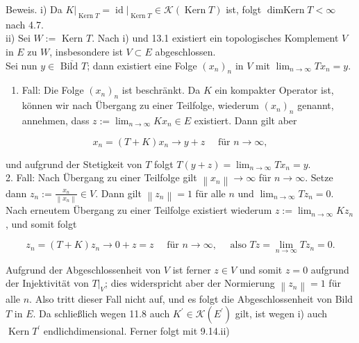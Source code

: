 \documentclass[10pt, letterpaper]{article}
\begin{document}
Beweis. i) Da $\left.K\right|_{\operatorname{Kern} T}=\left.\operatorname{id}\right|_{\operatorname{Kern} T} \in \mathcal{K}(\operatorname{Kern} T)$ ist, folgt $\operatorname{dimKern} T<\infty$ nach 4.7.\\
ii) Sei $W:=$ Kern $T$. Nach i) und 13.1 existiert ein topologisches Komplement $V$ in $E$ zu $W$, insbesondere ist $V \subset E$ abgeschlossen.\\
Sei nun $y \in \overline{\text { Bild } T}$; dann existiert eine Folge $\left(x_{n}\right)_{n}$ in $V$ mit $\lim _{n \rightarrow \infty} T x_{n}=y$.

\begin{enumerate}
  \item Fall: Die Folge $\left(x_{n}\right)_{n}$ ist beschränkt. Da $K$ ein kompakter Operator ist, können wir nach Übergang zu einer Teilfolge, wiederum $\left(x_{n}\right)_{n}$ genannt, annehmen, dass $z:=\lim _{n \rightarrow \infty} K x_{n} \in E$ existiert. Dann gilt aber
\end{enumerate}

$$
x_{n}=(T+K) x_{n} \rightarrow y+z \quad \text { für } n \rightarrow \infty,
$$

und aufgrund der Stetigkeit von $T$ folgt $T(y+z)=\lim _{n \rightarrow \infty} T x_{n}=y$.\\
2. Fall: Nach Übergang zu einer Teilfolge gilt $\left\|x_{n}\right\| \rightarrow \infty$ für $n \rightarrow \infty$. Setze dann $z_{n}:=\frac{x_{n}}{\left\|x_{n}\right\|} \in V$. Dann gilt $\left\|z_{n}\right\|=1$ für alle $n$ und $\lim _{n \rightarrow \infty} T z_{n}=0$. Nach erneutem Übergang zu einer Teilfolge existiert wiederum $z:=\lim _{n \rightarrow \infty} K z_{n}$, und somit folgt

$$
z_{n}=(T+K) z_{n} \rightarrow 0+z=z \quad \text { für } n \rightarrow \infty, \quad \text { also } T z=\lim _{n \rightarrow \infty} T z_{n}=0 .
$$

Aufgrund der Abgeschlossenheit von $V$ ist ferner $z \in V$ und somit $z=0$ aufgrund der Injektivität von $\left.T\right|_{V}$; dies widerspricht aber der Normierung $\left\|z_{n}\right\|=1$ für alle $n$. Also tritt dieser Fall nicht auf, und es folgt die Abgeschlossenheit von Bild $T$ in $E$. Da schließlich wegen 11.8 auch $K^{\prime} \in \mathcal{K}\left(E^{\prime}\right)$ gilt, ist wegen i) auch $\operatorname{Kern} T^{\prime}$ endlichdimensional. Ferner folgt mit 9.14.ii)
\end{document}
